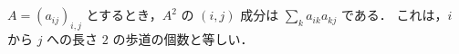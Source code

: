 \subsection{}
$A = (a_{ij})_{i,j}$ とするとき，$A^2$ の $(i,j)$ 成分は $\sum_{k} a_{ik}a_{kj}$ である．
これは，$i$ から $j$ への長さ $2$ の歩道の個数と等しい．
